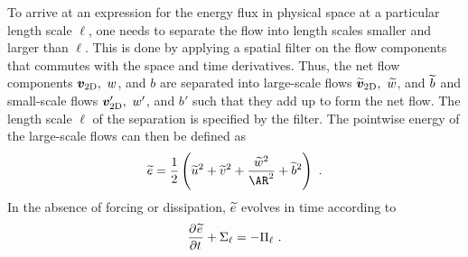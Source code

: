 \documentclass[../Rajarshi-thesis-draft.tex]{subfiles}
\begin{document}
	To arrive at an expression for the energy flux in physical space at a particular length scale $\ell$, one needs to separate the flow into length scales smaller and larger than $\ell$. This is done by applying a spatial filter on the flow components that commutes with the space and time derivatives. Thus, the net flow components $\vec{v}_{\rm 2D}, \ w$, and $b$ are separated into large-scale flows $\t{\vec{v}}_{\rm 2D},\ \t{w}$, and $\t{b}$ and small-scale flows $\vec{v}_{\rm 2D}', \ w'$, and $b'$ such that they add up to form the net flow. The length scale $\ell$ of the separation is specified by the filter. The pointwise energy of the large-scale flows can then be defined as 
    \begin{align}
    \label{edwv-flte}
    \begin{split}
        \t{e} = \frac{1}{2}\left( \t{u}^2 + \t{v}^2 + \frac{\t{w}^2}{\AR^2 } + \t{b}^2 \right) \ .
    \end{split}
    \end{align}
 In the absence of forcing or dissipation, $\t{e}$ evolves in time according to 
    \begin{align}
        \label{edwv-ebdg}
        \begin{split}
            \Dp{\t{e}}{t}{} + \Sigma_\ell = - \Pi_\ell \ .
        \end{split}
    \end{align}
    
\end{document}
